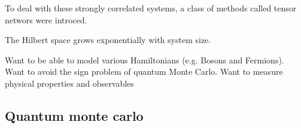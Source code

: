 
To deal with these strongly correlated systems, a class of methods called tensor networs were introced.

The Hilbert space grows exponentially with system size.

Want to be able to model various Hamiltonians (e.g. Bosons and
Fermions).
Want to avoid the sign problem of quantum Monte Carlo.
Want to measure physical properties and observables

\subsection{Quantum monte carlo}